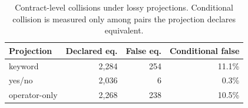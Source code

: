 \begin{table}[H]
\centering
\caption{Contract-level collisions under lossy projections. Conditional collision is measured only among pairs the projection declares equivalent.}
\label{tab:projection-failure}
\small
\begin{tabular}{lrrr}
\toprule
Projection & Declared eq. & False eq. & Conditional false \\
\midrule
keyword & 2,284 & 254 & 11.1\% \\
yes/no & 2,036 & 6 & 0.3\% \\
operator-only & 2,268 & 238 & 10.5\% \\
\bottomrule
\end{tabular}
\end{table}

